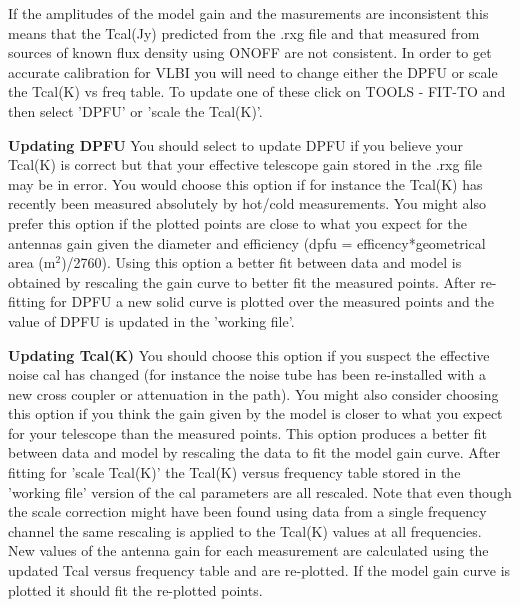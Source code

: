  
\vskip 0.5cm

   If the amplitudes of the model gain and the masurements are 
   inconsistent this means that the Tcal(Jy) 
   predicted from the .rxg file and that measured from sources
   of known flux density using ONOFF are not consistent.
   In order to get accurate calibration for VLBI  you will  
   need to change either the DPFU or scale the  Tcal(K) vs freq table. 
   To update one of these click on TOOLS - FIT-TO and then select  
   'DPFU' or  'scale the Tcal(K)'. 

\vskip 0.5cm

   {\bf Updating DPFU} You should select to update 
   DPFU if you believe your Tcal(K) is correct but that 
   your effective telescope gain stored in the .rxg 
   file may be in error.  You would choose this 
   option if for instance the Tcal(K) has recently been 
   measured absolutely by hot/cold measurements. You might 
   also prefer this option if  the  plotted points are close to 
   what you expect for the antennas gain given 
   the diameter and efficiency  (dpfu  = efficency*geometrical area 
   (m$^2$)/2760). Using this  option a better fit between data and model 
   is obtained  by rescaling the gain curve to better fit the measured 
   points. After re-fitting for DPFU  a new solid curve is plotted over 
   the measured points and the  value of DPFU is updated in 
   the 'working file'. 
   
\vskip 0.5cm

   {\bf Updating Tcal(K)}  You should choose this  option if you
   suspect the effective noise cal has changed (for instance 
   the  noise tube has been re-installed with a new cross 
   coupler or attenuation in the path). You might 
   also consider choosing  this option if you think the gain given by 
   the model is closer to what you expect for your telescope than  
   the measured points.  This option produces a better fit between 
   data and model by rescaling the data to fit the model gain curve. 
   After fitting for 'scale Tcal(K)' the Tcal(K) versus
   frequency table stored in the 'working file' version of the 
   cal parameters are all rescaled. Note that even though the scale 
   correction might  have been found using data from a single frequency 
   channel the same rescaling is applied to the Tcal(K) values 
   at all frequencies. New values of the antenna gain for each measurement 
   are calculated using the updated Tcal versus frequency table
   and are re-plotted. If the model gain curve is plotted it should 
   fit the re-plotted points.



